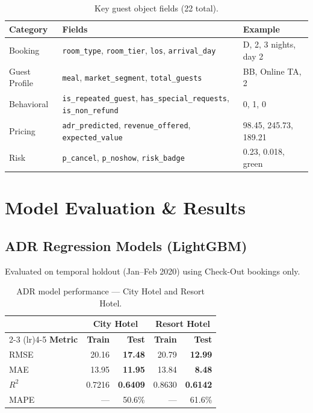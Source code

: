\documentclass[12pt,a4paper,openany]{report}
\begin{document}
\begin{table}[H]
\centering
\caption{Key guest object fields (22 total).}
\label{tab:guestschema}
\small
\begin{tabular}{@{}lll@{}}
\toprule
\textbf{Category} & \textbf{Fields} & \textbf{Example} \\
\midrule
Booking       & \texttt{room\_type}, \texttt{room\_tier}, \texttt{los}, \texttt{arrival\_day} & D, 2, 3 nights, day 2 \\
Guest Profile & \texttt{meal}, \texttt{market\_segment}, \texttt{total\_guests} & BB, Online TA, 2 \\
Behavioral    & \texttt{is\_repeated\_guest}, \texttt{has\_special\_requests}, \texttt{is\_non\_refund} & 0, 1, 0 \\
Pricing       & \texttt{adr\_predicted}, \texttt{revenue\_offered}, \texttt{expected\_value} & \texteuro{}98.45, \texteuro{}245.73, \texteuro{}189.21 \\
Risk          & \texttt{p\_cancel}, \texttt{p\_noshow}, \texttt{risk\_badge} & 0.23, 0.018, green \\
\bottomrule
\end{tabular}
\end{table}



\chapter{Model Evaluation \& Results}
\label{ch:evaluation}

\section{ADR Regression Models (LightGBM)}

Evaluated on temporal holdout (Jan--Feb 2020) using Check-Out bookings only.

\begin{table}[H]
\centering
\caption{ADR model performance --- City Hotel and Resort Hotel.}
\label{tab:adr}
\begin{tabular}{@{}lrrrr@{}}
\toprule
 & \multicolumn{2}{c}{\textbf{City Hotel}} & \multicolumn{2}{c}{\textbf{Resort Hotel}} \\
\cmidrule(lr){2-3} \cmidrule(lr){4-5}
\textbf{Metric} & \textbf{Train} & \textbf{Test} & \textbf{Train} & \textbf{Test} \\
\midrule
RMSE & 20.16 & \textbf{17.48} & 20.79 & \textbf{12.99} \\
MAE  & 13.95 & \textbf{11.95} & 13.84 & \textbf{8.48} \\
$R^2$& 0.7216& \textbf{0.6409} & 0.8630& \textbf{0.6142} \\
MAPE & ---   & 50.6\%          & ---   & 61.6\% \\
\bottomrule
\end{tabular}
\end{table}
\end{document}
